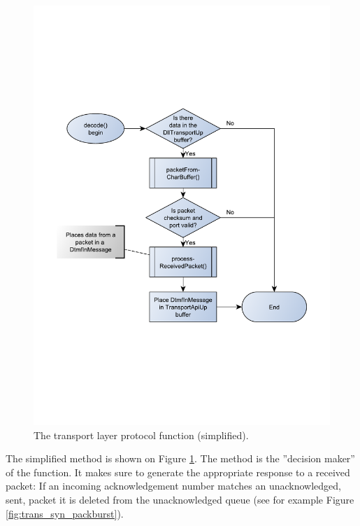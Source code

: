 \begin{figure}[htb]
 \centering
 \includegraphics[scale=0.66,trim=0 200 0 200]{content/graphics/transport/trans_decode_flowchart_simple.pdf}%
 \caption{The transport layer protocol  function (simplified).}
 \label{fig:trans_decode_flowchart_simple}
\end{figure}

The simplified  method is shown on Figure \ref{fig:trans_decode_flowchart_simple}. The  method is the ''decision maker'' of the  function. It makes sure to generate the appropriate response to a received packet: If an incoming acknowledgement number matches an unacknowledged, sent, packet it is deleted from the unacknowledged queue (see for example Figure \ref{fig:trans_syn_packburst}).



